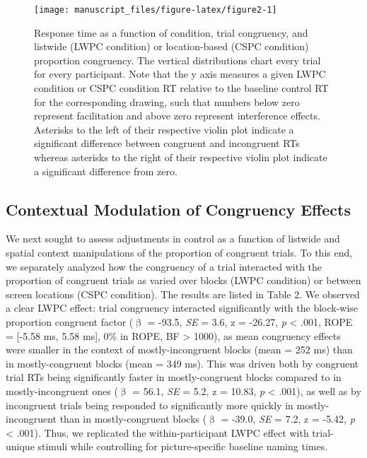 \documentclass[
  ,man,floatsintext]{apa6}
\begin{document}
\begin{figure}[!h]
\texttt{[image: manuscript\_files/figure-latex/figure2-1]} \caption{Response time as a function of condition, trial congruency, and listwide (LWPC condition) or location-based (CSPC condition) proportion congruency. The vertical distributions chart every trial for every participant. Note that the y axis measures a given LWPC condition or CSPC condition RT relative to the baseline control RT for the corresponding drawing, such that numbers below zero represent facilitation and above zero represent interference effects. Asterisks to the left of their respective violin plot indicate a significant difference between congruent and incongruent RTs whereas asterisks to the right of their respective violin plot indicate a significant difference from zero.}\label{fig:figure2}
\end{figure}



\hypertarget{contextual-modulation-of-congruency-effects}{%
\subsection{Contextual Modulation of Congruency Effects}\label{contextual-modulation-of-congruency-effects}}

We next sought to assess adjustments in control as a function of listwide and spatial context manipulations of the proportion of congruent trials. To this end, we separately analyzed how the congruency of a trial interacted with the proportion of congruent trials as varied over blocks (LWPC condition) or between screen locations (CSPC condition). The results are listed in Table 2. We observed a clear LWPC effect: trial congruency interacted significantly with the block-wise proportion congruent factor (\(\upbeta\) = -93.5, \emph{SE} = 3.6, z = -26.27, \emph{p} \textless{} .001, ROPE = {[}-5.58 ms, 5.58 ms{]}, 0\% in ROPE, BF \textgreater{} 1000), as mean congruency effects were smaller in the context of mostly-incongruent blocks (mean = 252 ms) than in mostly-congruent blocks (mean = 349 ms). This was driven both by congruent trial RTs being significantly faster in mostly-congruent blocks compared to in mostly-incongruent ones (\(\upbeta\) = 56.1, \emph{SE} = 5.2, z = 10.83, \emph{p} \textless{} .001), as well as by incongruent trials being responded to significantly more quickly in mostly-incongruent than in mostly-congruent blocks (\(\upbeta\) = -39.0, \emph{SE} = 7.2, z = -5.42, \emph{p} \textless{} .001). Thus, we replicated the within-participant LWPC effect with trial-unique stimuli while controlling for picture-specific baseline naming times.
\end{document}
